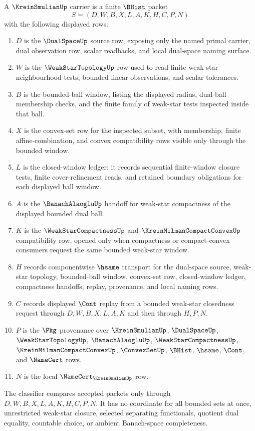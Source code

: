 \begin{definition}
\label{def:krein-smulian-carrier}
A $\KreinSmulianUp$ carrier is a finite $\BHist$ packet
$$
S=(D,W,B,X,L,A,K,H,C,P,N)
$$
with the following displayed rows:
\begin{enumerate}
\item $D$ is the $\DualSpaceUp$ source row, exposing only the named primal carrier, dual observation row, scalar readbacks, and local dual-space naming surface.
\item $W$ is the $\WeakStarTopologyUp$ row used to read finite weak-star neighbourhood tests, bounded-linear observations, and scalar tolerances.
\item $B$ is the bounded-ball window, listing the displayed radius, dual-ball membership checks, and the finite family of weak-star tests inspected inside that ball.
\item $X$ is the convex-set row for the inspected subset, with membership, finite affine-combination, and convex compatibility rows visible only through the bounded window.
\item $L$ is the closed-window ledger: it records sequential finite-window closure tests, finite cover-refinement reads, and retained boundary obligations for each displayed ball window.
\item $A$ is the $\BanachAlaogluUp$ handoff for weak-star compactness of the displayed bounded dual ball.
\item $K$ is the $\WeakStarCompactnessUp$ and $\KreinMilmanCompactConvexUp$ compatibility row, opened only when compactness or compact-convex consumers request the same bounded weak-star window.
\item $H$ records componentwise $\hsame$ transport for the dual-space source, weak-star topology, bounded-ball window, convex-set row, closed-window ledger, compactness handoffs, replay, provenance, and local naming rows.
\item $C$ records displayed $\Cont$ replay from a bounded weak-star closedness request through $D,W,B,X,L,A,K$ and then through $H,P,N$.
\item $P$ is the $\Pkg$ provenance over $\KreinSmulianUp$, $\DualSpaceUp$, $\WeakStarTopologyUp$, $\BanachAlaogluUp$, $\WeakStarCompactnessUp$, $\KreinMilmanCompactConvexUp$, $\ConvexSetUp$, $\BHist$, $\hsame$, $\Cont$, and $\NameCert$ rows.
\item $N$ is the local $\NameCert_{\KreinSmulianUp}$ row.
\end{enumerate}
The classifier compares accepted packets only through $D,W,B,X,L,A,K,H,C,P,N$. It has no coordinate for all bounded sets at once, unrestricted weak-star closure, selected separating functionals, quotient dual equality, countable choice, or ambient Banach-space completeness.
\end{definition}

